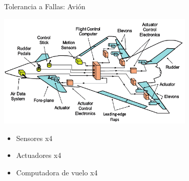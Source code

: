\begin{frame}{Tolerancia a Fallas: Avión}
	\begin{center}
		\includegraphics[width=0.7\textwidth]{img/avion_FBW.png}
	\end{center}
	\begin{itemize}
		\item Sensores x4
		\item Actuadores x4
		\item Computadora de vuelo x4
	\end{itemize}
\end{frame}

